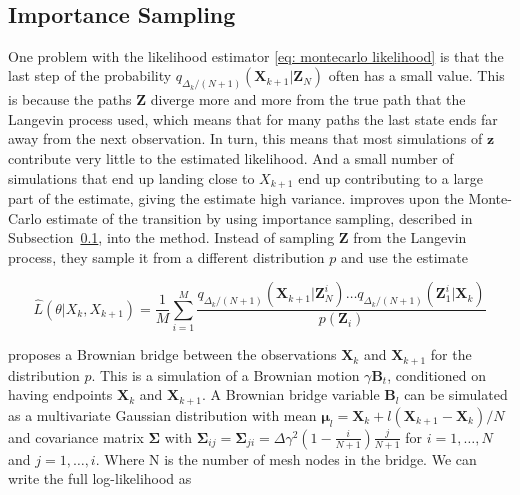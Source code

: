 \

\subsection{Importance Sampling}
\label{subsec: importance sampling}
One problem with the likelihood estimator \eqref{eq: montecarlo likelihood} is that the last step of the probability $q_{\Delta_k/(N+1)}(\textbf{X}_{k+1}|\textbf{Z}_N)$ often has a small value. This is because the paths $\textbf{Z}$ diverge more and more from the true path that the Langevin process used, which means that for many paths the last state ends far away from the next observation. In turn, this means that most simulations of $\textbf{z}$ contribute very little to the estimated likelihood. And a small number of simulations that end up landing close to $X_{k+1}$ end up contributing to a large part of the estimate, giving the estimate high variance. \parencite{durham_numerical_2002} improves upon the Monte-Carlo estimate of the transition by using importance sampling, described in Subsection~\ref{subsec: importance sampling}, into the method. Instead of sampling $\textbf{Z}$ from the Langevin process, they sample it from a different distribution $p$ and use the estimate

\begin{equation}
\hat{L}(\theta|X_k, X_{k+1}) = \frac{1}{M}\sum_{i=1}^M \frac{q_{\Delta_k/(N+1)}(\textbf{X}_{k+1}|\textbf{Z}^i_N)\dots q_{\Delta_k/(N+1)}(\textbf{Z}^i_1|\textbf{X}_k)}{p(\textbf{Z}_i)}
\label{eq: importance sampling likelihood}
\end{equation}


\parencite{durham_numerical_2002} proposes a Brownian bridge between the observations $\textbf{X}_k$ and $\textbf{X}_{k+1}$ for the distribution $p$. This is a simulation of a Brownian motion $\gamma \textbf{B}_t$, conditioned on having endpoints $\textbf{X}_k$ and $\textbf{X}_{k+1}$. A Brownian bridge variable $\textbf{B}_l$ can be simulated as a multivariate Gaussian distribution with mean $\bm \mu_l = \textbf{X}_k + l(\textbf{X}_{k+1}-\textbf{X}_k)/N$ and covariance matrix $\bm \Sigma$ with $\bm \Sigma_{ij} = \bm \Sigma_{ji}= \Delta \gamma^2(1-\frac{i}{N+1}) \frac{j}{N+1}$ for $i = 1, \dots , N$ and $j = 1, \dots, i$. Where N is the number of mesh nodes in the bridge. We can write the full log-likelihood as 


